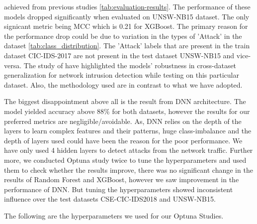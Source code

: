 achieved from previous studies \ref{tab:evaluation-results}. The performance of these models dropped significantly when evaluated on UNSW-NB15 dataset. 
The only signicant metric being MCC which is 0.21 for XGBoost. The primary reason for the performance drop could be due to variation in the types of 'Attack' 
in the dataset \ref{tab:class_distribution}. The 'Attack' labels that are present in the train dataset CIC-IDS-2017 are not present in the test dataset UNSW-NB15 
and vice-versa. The study of \cite{Chandra2025} have highlighted the models' robustness in cross-dataset generalization for network intrusion detection while testing 
on this particular dataset. Also, the methodology used are in contrast to what we have adopted. 

The biggest disappointment above all is the result from DNN architecture. The model yielded accuracy above 88\% for both datasets, however the results for our 
preferred metrics are negligible/avoidable. As, DNN relies on the depth of the layers to learn complex features and their patterns, huge class-imbalance and the depth
of layers used could have been the reason for the poor performance. We have only used 4 hidden layers to detect attacks from the network traffic. Further more, we 
conducted Optuna study twice to tune the hyperparameters and used them to check whether the results improve, there was no significant change in the results of 
Random Forest and XGBoost, however we saw improvement in the performance of DNN. But tuning the hyperparameters showed inconsistent influence over the test datasets 
CSE-CIC-IDS2018 and UNSW-NB15.  

The following are the hyperparameters we used for our Optuna Studies.

